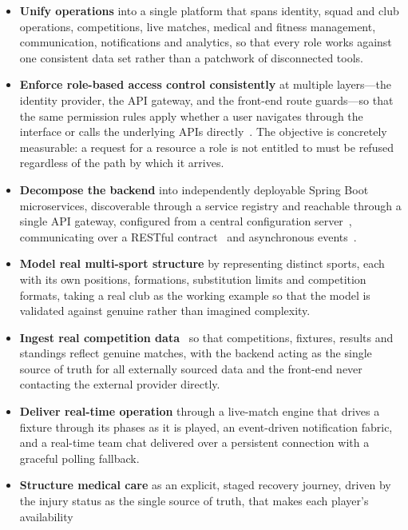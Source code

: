 \begin{itemize}
  \item \textbf{Unify operations} into a single platform that spans identity, squad and
        club operations, competitions, live matches, medical and fitness management,
        communication, notifications and analytics, so that every role works against one
        consistent data set rather than a patchwork of disconnected tools.
  \item \textbf{Enforce role-based access control consistently} at multiple layers---the
        identity provider, the API gateway, and the front-end route guards---so that the same
        permission rules apply whether a user navigates through the interface or calls the
        underlying APIs directly~\cite{rbac}. The objective is concretely measurable: a
        request for a resource a role is not entitled to must be refused regardless of the
        path by which it arrives.
  \item \textbf{Decompose the backend} into independently deployable Spring
        Boot~\cite{springboot} microservices, discoverable through a service registry and
        reachable through a single API gateway, configured from a central configuration
        server~\cite{springcloud}, communicating over a RESTful contract~\cite{restapi} and
        asynchronous events~\cite{microservices}.
  \item \textbf{Model real multi-sport structure} by representing distinct sports, each
        with its own positions, formations, substitution limits and competition formats,
        taking a real club as the working example so that the model is validated against
        genuine rather than imagined complexity.
  \item \textbf{Ingest real competition data}~\cite{footballdata} so that competitions,
        fixtures, results and standings reflect genuine matches, with the backend acting as
        the single source of truth for all externally sourced data and the front-end never
        contacting the external provider directly.
  \item \textbf{Deliver real-time operation} through a live-match engine that drives a
        fixture through its phases as it is played, an event-driven notification fabric, and a
        real-time team chat delivered over a persistent connection with a graceful polling
        fallback.
  \item \textbf{Structure medical care} as an explicit, staged recovery journey, driven by
        the injury status as the single source of truth, that makes each player's availability

\end{itemize}
